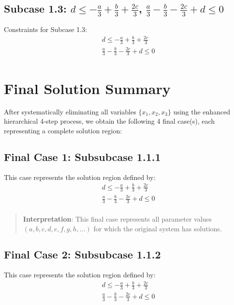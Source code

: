 \documentclass{article}
\newenvironment{stepdetail}
  {\begin{quote}\small\color{blue}}
  {\end{quote}}
\begin{document}
\subsection{Subcase 1.3: $d \leq - \frac{a}{3} + \frac{b}{3} + \frac{2 c}{3}$, $\frac{a}{3} - \frac{b}{3} - \frac{2 c}{3} + d \leq 0$}

Constraints for Subcase 1.3:
\begin{align}
& d \leq - \frac{a}{3} + \frac{b}{3} + \frac{2 c}{3} \\
& \frac{a}{3} - \frac{b}{3} - \frac{2 c}{3} + d \leq 0 \\
\end{align}

\section{Final Solution Summary}

After systematically eliminating all variables $\{x_{1}, x_{2}, x_{3}\}$
using the enhanced hierarchical 4-step process, we obtain the following
4 final case(s), each representing a complete solution region:

\subsection{Final Case 1: Subsubcase 1.1.1}

This case represents the solution region defined by:
\begin{align}
& d \leq - \frac{a}{3} + \frac{b}{3} + \frac{2 c}{3} \\
& \frac{a}{3} - \frac{b}{3} - \frac{2 c}{3} + d \leq 0 \\
\end{align}

\begin{stepdetail}
\textbf{Interpretation}: This final case represents all parameter values
$(a, b, c, d, e, f, g, h, \ldots)$ for which the original system has solutions.
\end{stepdetail}

\subsection{Final Case 2: Subsubcase 1.1.2}

This case represents the solution region defined by:
\begin{align}
& d \leq - \frac{a}{3} + \frac{b}{3} + \frac{2 c}{3} \\
& \frac{a}{3} - \frac{b}{3} - \frac{2 c}{3} + d \leq 0 \\
\end{align}
\end{document}
